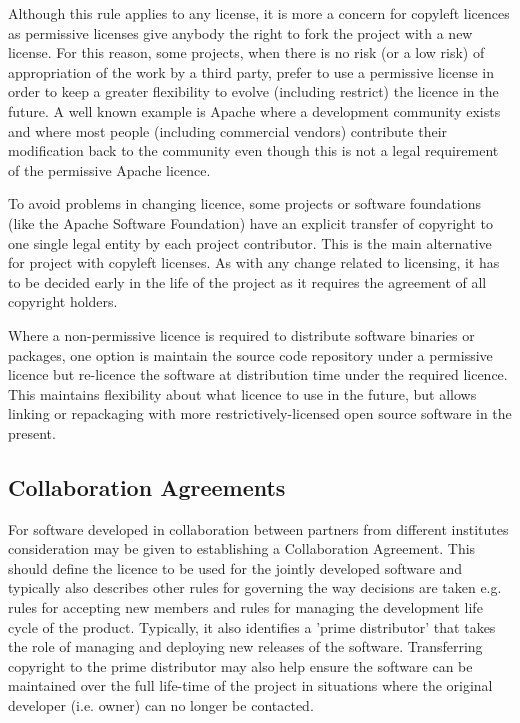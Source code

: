 \documentclass[12pt,a4paper]{article}
\begin{document}
Although this rule applies to any license, it is more a concern for copyleft licences as permissive licenses give anybody the right to fork the project with a new license. For this reason, some projects, when there is no risk (or a low risk) of appropriation of the work by a third party, prefer to use a permissive license in order to keep a greater flexibility to evolve (including restrict) the licence in the future. A well known example is Apache where a development community exists and where most people (including commercial vendors) contribute their modification back to the community even though this is not a legal requirement of the permissive Apache licence.

To avoid problems in changing licence, some projects or software foundations (like the Apache Software Foundation) have an explicit transfer of copyright to one single legal entity by each project contributor. This is the main alternative for project with copyleft licenses. As with any change related to licensing, it has to be decided early in the life of the project as it requires the agreement of all copyright holders.

Where a non-permissive licence is required to distribute software binaries or packages, one option is maintain the source code repository under a permissive licence but re-licence the software at distribution time under the required licence. This maintains flexibility about what licence to use in the future, but allows linking or repackaging with more restrictively-licensed open source software in the present.

\subsection{Collaboration Agreements}
\label{sec:CollaborationAgreements}

For software developed in collaboration between partners from different institutes consideration may be given to establishing a Collaboration Agreement. This should define the licence to be used for the jointly developed software and typically also describes other rules for governing the way decisions are taken e.g. rules for accepting new members and rules for managing the development life cycle of the product. Typically, it also identifies a 'prime distributor' that takes the role of managing and deploying new releases of the software. Transferring copyright to the prime distributor may also help ensure the software can be maintained over the full life-time of the project in situations where the original developer (i.e. owner) can no longer be contacted.
\end{document}
